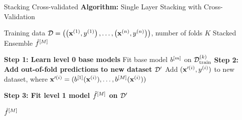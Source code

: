 \documentclass[11pt,compress,t,notes=noshow, xcolor=table]{beamer}
\begin{document}

\begin{vbframe}{Stacking Cross-validated}
\footnotesize
\textbf{Algorithm:} Single Layer Stacking with Cross-Validation
\begin{algorithmic}
    \Require Training data $\mathcal{D} = \left( \left(\mathbf{x}^{(1)}, y^{(1)}\right), \ldots, \left(\mathbf{x}^{(n)}, y^{(n)}\right)\right)$, number of folds $K$
    \Ensure Stacked Ensemble $\hat{f}^{[M]}$
    
        \State \textbf{Step 1: Learn level 0 base models}
            \State Fit base model $b^{[m]}$ on $\mathcal{D}_{\mathrm{train}}^{(k)}$
        \EndFor
        \State
        \State \textbf{Step 2: Add out-of-fold predictions to new dataset $\mathcal{D}^\prime$}
            \State Add $(\mathbf{x}^{\prime(i)}, y^{(i)})$ to new dataset, where $\mathbf{x}^{\prime(i)} = (b^{[1]}(\mathbf{x}^{(i)}), \ldots, b^{[M]}(\mathbf{x}^{(i)}))$
        \EndFor
    \EndFor

    \State
    \State \textbf{Step 3: Fit level 1 model $\hat{f}^{[M]}$ on $\mathcal{D}^\prime$}
    
    \State \Return $\hat{f}^{[M]}$
\end{algorithmic}

\end{vbframe}

\end{document}
